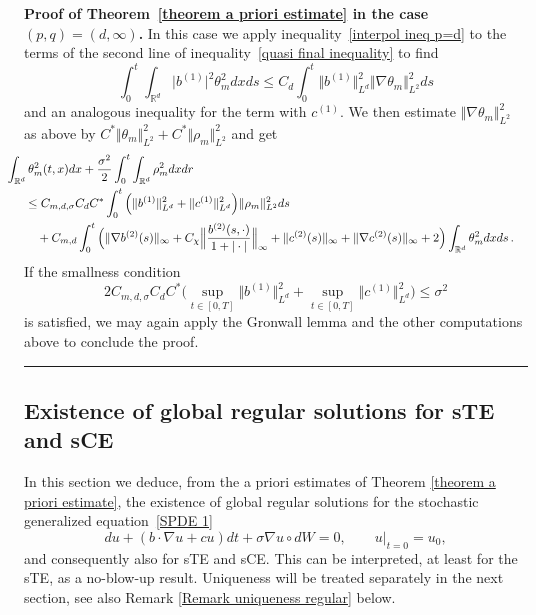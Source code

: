 \documentclass[a4paper,10pt]{article}
\newenvironment{proof}[1][Proof]{\noindent\textbf{#1.} }{\ \rule{0.5em}{0.5em}}
\begin{document}
\begin{proof}[Proof of Theorem~\ref{theorem a priori estimate} in the case
$(p,q) =(d,\infty)$] 
In this case we apply inequality~\eqref{interpol ineq p=d} to the terms of the second line of
inequality~\eqref{quasi final inequality} to find
\begin{equation*}
\int_{0}^{t}\int_{\mathbb{R}^{d}} \vert b^{(1)} \vert
^{2}\theta_{m}^{2}dxds  \leq C_d \int_{0}^{t} \Vert b^{(1) }\Vert _{L^{d}}^2 \Vert \nabla \theta_m \Vert_{L^{2}}^2 ds
\end{equation*}
and an analogous inequality for the term with $c^{(1)}$. We then estimate $\Vert \nabla\theta_{m} \Vert _{L^{2}}^{2}$ as above by $C^{\ast} \Vert \theta_{m} \Vert _{L^{2}}^{2}+C^{\ast} \Vert \rho_{m} \Vert _{L^{2} 
}^{2}$ and get
\begin{align*}
\lefteqn{\hspace{-0.5cm}  \int_{\mathbb{R}^{d}}\theta_{m}^{2}(t,x)dx+\frac{\sigma^{2}}{2}\int_{0} 
^{t}\int_{\mathbb{R}^{d}}\rho_{m}^{2}dxdr } \\
&  \leq C_{m,d,\sigma}C_{d}C^{\ast}\int_{0}^{t} \Big(  \Vert b^{(1) }\Vert _{L^{d}}^2 + \Vert c^{(1) }\Vert _{L^{d}}^2 \Big)  \Vert \rho_{m} \Vert _{L^{2}}^{2}ds\\
& \quad{}  +C_{m,d}\int_{0}^{t} \Big( \Vert \nabla b^{(2)}(s) \Vert_{\infty}+
C_{\chi}\Big\Vert \frac{b^{(2)}(s,\cdot) }{1+\vert \cdot \vert }\Big \Vert
_{\infty}+ \Vert c^{(2)}(s) \Vert _{\infty}+ \Vert \nabla c^{(2)
}(s) \Vert _{\infty} +2 \Big)  \int_{\mathbb{R}^{d}}\theta_{m}^{2}dxds \,.
\end{align*}
If the smallness condition
\begin{equation}
2C_{m,d,\sigma}C_{d}C^{\ast} \big(\sup_{t\in [0,T]  }  \Vert b^{(1) }\Vert _{L^{d}}^2 +\sup_{t\in [0,T]}  \Vert c^{(1) }\Vert _{L^{d}}^2 \big)  \leq\sigma^{2}\label{precise smallness} 
\end{equation}
is satisfied, we may again apply the Gronwall lemma and the other computations above to conclude the proof.
\end{proof}

\subsection{Existence of global regular solutions for sTE and
sCE\label{subsection regularity results}}

In this section we deduce, from the a priori estimates of Theorem
\ref{theorem a priori estimate}, the existence of global regular
solutions for the stochastic generalized equation~\eqref{SPDE 1}
\begin{equation}
du+ (b\cdot\nabla u+cu )  dt+ \sigma\nabla u\circ dW=0,\qquad
u|_{t=0}=u_{0}, \tag{sgTE}
\end{equation}
and consequently also for sTE and sCE. This can be interpreted, at least for the sTE, as a no-blow-up result. Uniqueness will be treated separately in the next section, see also Remark
\ref{Remark uniqueness regular} below. 
\end{document}
